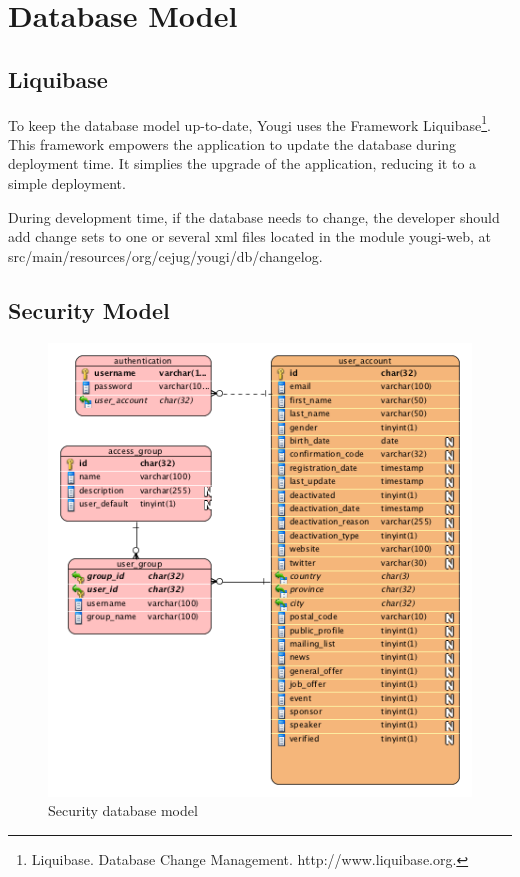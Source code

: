 \documentclass[envcountsame,envcountchap]{svmono}
\begin{document}
\section{Database Model}

\subsection{Liquibase}

To keep the database model up-to-date, Yougi uses the Framework Liquibase\footnote{Liquibase. Database Change Management.  http://www.liquibase.org.}. This framework empowers the application to update the database during deployment time. It simplies the upgrade of the application, reducing it to a simple deployment.

During development time, if the database needs to change, the developer should add change sets to one or several xml files located in the module yougi-web, at src/main/resources/org/cejug/yougi/db/changelog.

\subsection{Security Model}

\begin{figure}
\centering
\includegraphics{figures/security-db-model}
\caption{Security database model}
\label{fig:security-db-model}
\end{figure}
\end{document}
